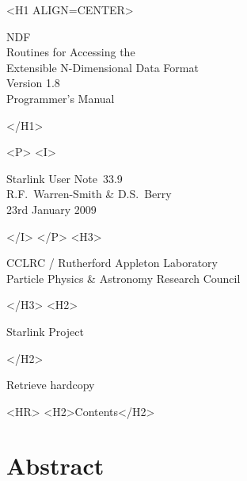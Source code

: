 \documentclass[twoside,11pt]{article}
\newcommand{\stardoccategory}  {Starlink User Note}
\newcommand{\stardocsource}    {sun\stardocnumber}
\newcommand{\stardocnumber}    {33.9}
\newcommand{\stardocauthors}   {R.F.~Warren-Smith \& D.S.~Berry}
\newcommand{\stardocdate}      {23rd January 2009}
\newcommand{\stardoctitle}     {NDF \\ [\latex{1ex}]
                                Routines for Accessing the\\
                                Extensible N-Dimensional Data Format}
\newcommand{\stardocversion}   {Version 1.8}
\newcommand{\stardocmanual}    {Programmer's Manual}
\newcommand{\htmladdnormallink}[2]{#1}
\newcommand{\htmladdimg}[1]{}
\newcommand{\htmlref}[2]{#1}
\newcommand{\htmladdtonavigation}[1]{}
\newcommand{\xlabel}[1]{}
\newcommand{\latex}[1]{#1}
\begin{document}
\begin{htmlonly}
   \xlabel{}
   \begin{rawhtml} <H1 ALIGN=CENTER> \end{rawhtml}
      \stardoctitle\\
      \stardocversion\\
      \stardocmanual
   \begin{rawhtml} </H1> \end{rawhtml}


   \begin{rawhtml} <P> <I> \end{rawhtml}
   \stardoccategory\ \stardocnumber \\
   \stardocauthors \\
   \stardocdate
   \begin{rawhtml} </I> </P> <H3> \end{rawhtml}
      \htmladdnormallink{CCLRC}{http://www.cclrc.ac.uk} /
      \htmladdnormallink{Rutherford Appleton Laboratory}
                        {http://www.cclrc.ac.uk/ral} \\
      \htmladdnormallink{Particle Physics \& Astronomy Research Council}
                        {http://www.pparc.ac.uk} \\
   \begin{rawhtml} </H3> <H2> \end{rawhtml}
      \htmladdnormallink{Starlink Project}{http://star-www.rl.ac.uk/}
   \begin{rawhtml} </H2> \end{rawhtml}
   \htmladdnormallink{\htmladdimg{source.gif} Retrieve hardcopy}
      {http://star-www.rl.ac.uk/cgi-bin/hcserver?\stardocsource}\\

  \label{stardoccontents}
  \begin{rawhtml} 
    <HR>
    <H2>Contents</H2>
  \end{rawhtml}
  \htmladdtonavigation{\htmlref{\htmladdimg{contents_motif.gif}}
        {stardoccontents}}

  \section{\xlabel{abstract}Abstract}
\end{htmlonly}
\end{document}
